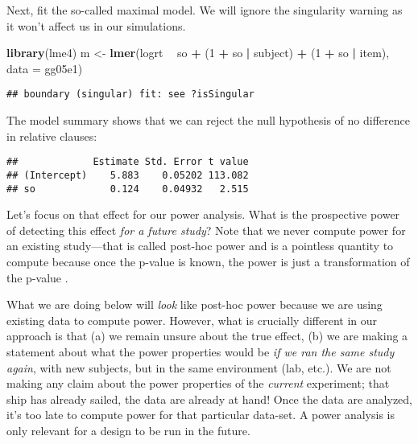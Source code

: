 \documentclass[12pt,]{krantz}
\newenvironment{Shaded}{\begin{snugshade}}{\end{snugshade}}
\newcommand{\DataTypeTok}[1]{\textcolor[rgb]{0.13,0.29,0.53}{#1}}
\newcommand{\DecValTok}[1]{\textcolor[rgb]{0.00,0.00,0.81}{#1}}
\newcommand{\KeywordTok}[1]{\textcolor[rgb]{0.13,0.29,0.53}{\textbf{#1}}}
\newcommand{\NormalTok}[1]{#1}
\newcommand{\OperatorTok}[1]{\textcolor[rgb]{0.81,0.36,0.00}{\textbf{#1}}}
\newcommand{\StringTok}[1]{\textcolor[rgb]{0.31,0.60,0.02}{#1}}
\begin{document}
Next, fit the so-called maximal model. We will ignore the singularity warning as it won't affect us in our simulations.

\begin{Shaded}
\begin{Highlighting}[]
\KeywordTok{library}\NormalTok{(lme4)}
\NormalTok{m <-}\StringTok{ }\KeywordTok{lmer}\NormalTok{(logrt }\OperatorTok{~}\StringTok{ }\NormalTok{so }\OperatorTok{+}\StringTok{ }\NormalTok{(}\DecValTok{1} \OperatorTok{+}\StringTok{ }\NormalTok{so }\OperatorTok{|}\StringTok{ }\NormalTok{subject) }\OperatorTok{+}\StringTok{ }
\StringTok{  }\NormalTok{(}\DecValTok{1} \OperatorTok{+}\StringTok{ }\NormalTok{so }\OperatorTok{|}\StringTok{ }\NormalTok{item), }\DataTypeTok{data =}\NormalTok{ gg05e1)}
\end{Highlighting}
\end{Shaded}

\begin{verbatim}
## boundary (singular) fit: see ?isSingular
\end{verbatim}

The model summary shows that we can reject the null hypothesis of no difference in relative clauses:

\begin{Shaded}
\end{Shaded}

\begin{verbatim}
##             Estimate Std. Error t value
## (Intercept)    5.883    0.05202 113.082
## so             0.124    0.04932   2.515
\end{verbatim}

Let's focus on that effect for our power analysis. What is the prospective power of detecting this effect \emph{for a future study}? Note that we never compute power for an existing study---that is called post-hoc power and is a pointless quantity to compute because once the p-value is known, the power is just a transformation of the p-value \citep{hoenigheisey}.

What we are doing below will \emph{look} like post-hoc power because we are using existing data to compute power. However, what is crucially different in our approach is that (a) we remain unsure about the true effect, (b) we are making a statement about what the power properties would be \emph{if we ran the same study again}, with new subjects, but in the same environment (lab, etc.). We are not making any claim about the power properties of the \emph{current} experiment; that ship has already sailed, the data are already at hand! Once the data are analyzed, it's too late to compute power for that particular data-set. A power analysis is only relevant for a design to be run in the future.
\end{document}
